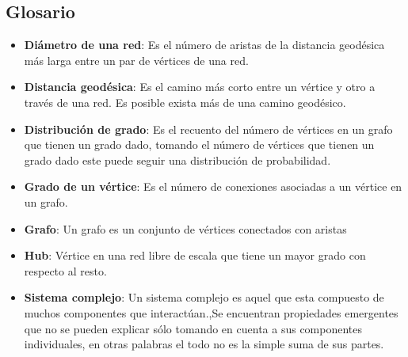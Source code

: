\subsection{Glosario}
\begin{itemize}
    \item \textbf{Diámetro de una red}\cite{RosenDiscrete}: Es el número de aristas de la distancia geodésica más larga
    entre un par de vértices de una red.
    \item \textbf{Distancia geodésica}\cite{RosenDiscrete}: Es el camino más corto entre un vértice y otro a través de una red. Es posible exista más de una camino geodésico.
    \item \textbf{Distribución de grado}\cite{BarabasiNetwork}: Es el recuento del número de vértices en un grafo que tienen un grado dado, tomando el número de vértices que tienen un grado dado este puede seguir una distribución de probabilidad.
    \item \textbf{Grado de un vértice}\cite{RosenDiscrete}: Es el número de conexiones asociadas a un vértice en un grafo.
    \item \textbf{Grafo}: Un grafo es un conjunto de vértices conectados con aristas
    \item \textbf{Hub}\cite{BarabasiNetwork}: Vértice en una red libre de escala que tiene un mayor grado con respecto al resto.
    \item \textbf{Sistema complejo}\cite{BarabasiNetwork}: Un sistema complejo es aquel que esta compuesto de muchos componentes que interactúan.,Se encuentran propiedades emergentes que no se pueden explicar sólo tomando en cuenta a sus componentes individuales, en otras palabras el todo no es la simple suma de sus partes.
\end{itemize}

